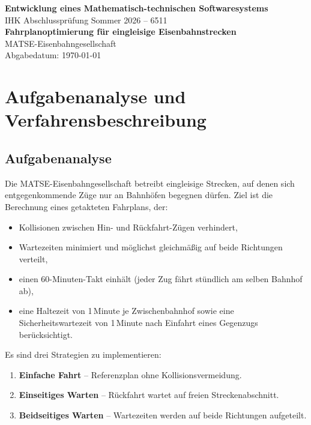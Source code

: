\documentclass[12pt,a4paper]{article}
\begin{document}
\begin{titlepage}
  \centering
  \vspace*{2cm}
  {\LARGE\bfseries Entwicklung eines Mathematisch-technischen Softwaresystems\\[0.5em]}
  {\large IHK Abschlussprüfung Sommer 2026 -- 6511\\[1em]}
  {\large\bfseries Fahrplanoptimierung für eingleisige Eisenbahnstrecken\\[2em]}
  {\large MATSE-Eisenbahngesellschaft\\[3em]}
  \vfill
  {\normalsize Abgabedatum: \today}
\end{titlepage}

\tableofcontents
\newpage

\section{Aufgabenanalyse und Verfahrensbeschreibung}

\subsection{Aufgabenanalyse}

Die MATSE-Eisenbahngesellschaft betreibt eingleisige Strecken, auf denen sich
entgegenkommende Züge nur an Bahnhöfen begegnen dürfen. Ziel ist die Berechnung
eines getakteten Fahrplans, der:
\begin{itemize}
  \item Kollisionen zwischen Hin- und Rückfahrt-Zügen verhindert,
  \item Wartezeiten minimiert und möglichst gleichmäßig auf beide Richtungen verteilt,
  \item einen 60-Minuten-Takt einhält (jeder Zug fährt stündlich am selben Bahnhof ab),
  \item eine Haltezeit von 1\,Minute je Zwischenbahnhof sowie eine Sicherheitswartezeit
        von 1\,Minute nach Einfahrt eines Gegenzugs berücksichtigt.
\end{itemize}

\noindent
Es sind drei Strategien zu implementieren:
\begin{enumerate}
  \item \textbf{Einfache Fahrt} -- Referenzplan ohne Kollisionsvermeidung.
  \item \textbf{Einseitiges Warten} -- Rückfahrt wartet auf freien Streckenabschnitt.
  \item \textbf{Beidseitiges Warten} -- Wartezeiten werden auf beide Richtungen aufgeteilt.
\end{enumerate}
\end{document}
